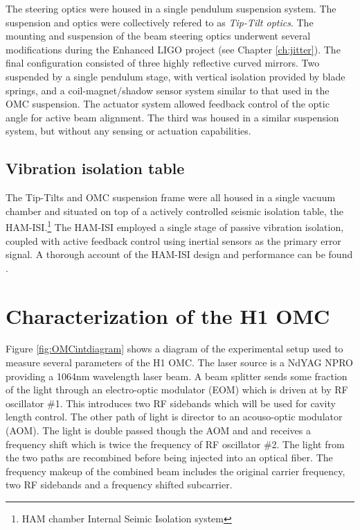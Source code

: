 The steering optics were housed in a single pendulum suspension system. %
The suspension and optics were collectively refered to as \emph{Tip-Tilt optics}. %
The mounting and suspension of the beam steering optics underwent several modifications during the Enhanced LIGO project (see Chapter \ref{ch:jitter}). %
The final configuration consisted of three highly reflective curved mirrors. %
Two suspended by a single pendulum stage, with vertical isolation provided by blade springs, and a coil-magnet/shadow sensor system similar to that used in the OMC suspension. %
The actuator system allowed feedback control of the optic angle for active beam alignment. %
The third was housed in a similar suspension system, but without any sensing or actuation capabilities.

\subsection{Vibration isolation table}
The Tip-Tilts and OMC suspension frame were all housed in a single vacuum chamber and situated on top of a actively controlled seismic isolation table, the HAM-ISI.\footnote{HAM chamber Internal Seimic Isolation system} The HAM-ISI employed a single stage of passive vibration isolation, coupled with active feedback control using inertial sensors as the primary error signal. %
A thorough account of the HAM-ISI design and performance can be found .

\section{Characterization of the H1 OMC}

Figure \ref{fig:OMCintdiagram} shows a diagram of the experimental setup used to measure several parameters of the H1 OMC. %
The laser source is a NdYAG NPRO providing a 1064nm wavelength laser beam. %
A beam splitter sends some fraction  of the light through an electro-optic modulator (EOM) which is driven at by RF oscillator \#1. %
This introduces two RF sidebands which will be used for cavity length control. %
The other path of light is director to an acouso-optic modulator (AOM). %
The light is double passed though the AOM and and receives a frequency shift which is twice the frequency of RF oscillator \#2. %
The light from the two paths are recombined before being injected into an optical fiber. %
The frequency makeup of the combined beam includes the original carrier frequency, two RF sidebands and a frequency shifted subcarrier.

